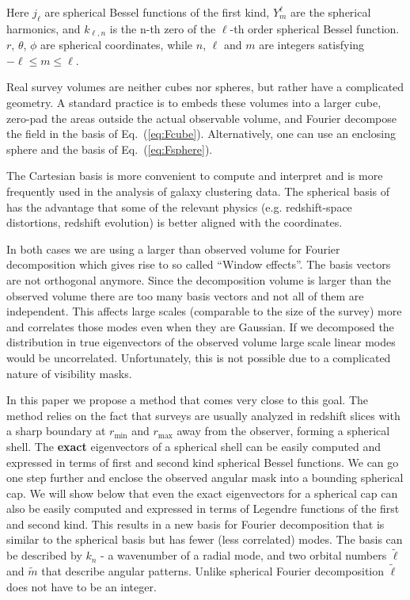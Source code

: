\documentclass[fleqn,usenatbib]{mnras}
\newcommand{\rmin}{r_\mathrm{min}}
\newcommand{\rmax}{r_\mathrm{max}}
\begin{document}
Here $j_\ell$ are spherical Bessel functions of the first kind, $Y^\ell_m$ are
the spherical harmonics, and $k_{\ell,n}$ is the n-th zero of the $\ell$-th
order spherical Bessel function. $r$, $\theta$, $\phi$ are spherical
coordinates, while $n$, $\ell$ and $m$ are integers satisfying $-\ell \leq m
\leq \ell$.

Real survey volumes are neither cubes nor spheres, but rather have a complicated
geometry. A standard practice is to embeds these volumes into a larger cube,
zero-pad the areas outside the actual observable volume, and Fourier decompose
the field in the basis of Eq.~(\ref{eq:Fcube}). Alternatively, one can use an
enclosing sphere and the basis of Eq.~(\ref{eq:Fsphere}).

The Cartesian basis is more convenient to compute and interpret and is more
frequently used in the analysis of galaxy clustering data. The spherical basis
of has the advantage that some of the relevant physics (e.g. redshift-space
distortions, redshift evolution) is better aligned with the coordinates.

In both cases we are using a larger than observed volume for Fourier
decomposition which gives rise to so called ``Window effects''. The basis
vectors are not orthogonal anymore. Since the decomposition volume is larger
than the observed volume there are too many basis vectors and not all of them
are independent. This affects large scales (comparable to the size of the
survey) more and correlates those modes even when they are Gaussian. If we
decomposed the distribution in true eigenvectors of the observed volume large
scale linear modes would be uncorrelated. Unfortunately, this is not possible
due to a complicated nature of visibility masks.

In this paper we propose a method that comes very close to this goal. The method
relies on the fact that surveys are usually analyzed in redshift slices with a
sharp boundary at $\rmin$ and $\rmax$ away from the observer,
forming a spherical shell. The \textbf{exact} eigenvectors of a spherical shell
can be easily computed and expressed in terms of first and second kind spherical
Bessel functions. We can go one step further and enclose the observed angular
mask into a bounding spherical cap. We will show below that even the exact
eigenvectors for a spherical cap can also be easily computed and expressed in
terms of Legendre functions of the first and second kind. This results in a new
basis for Fourier decomposition that is similar to the spherical basis but has
fewer (less correlated) modes. The basis can be described by $k_n$ - a
wavenumber of a radial mode, and two orbital numbers $\widetilde{\ell}$ and
$\widetilde{m}$ that describe angular patterns. Unlike spherical Fourier
decomposition $ \widetilde{\ell}$ does not have to be an integer.
\end{document}
